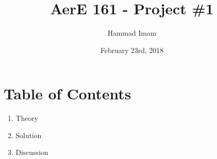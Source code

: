 \documentclass{article}
\title{AerE 161 - Project \#1}
\author{Hammad Imam}
\date{February 23rd, 2018}
\begin{document}
\maketitle

\section*{Table of Contents}
\begin{enumerate}
    \item Theory
    \item Solution
    \item Discussion 
\end{enumerate}
\end{document}
